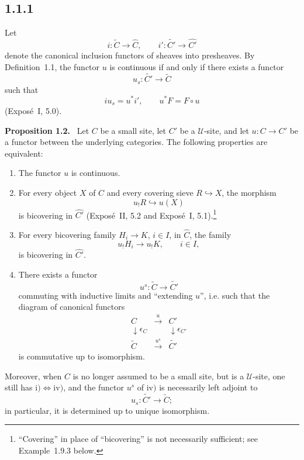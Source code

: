\documentclass[11pt]{article}
\newcommand{\U}{\mathcal{U}}
\newenvironment{statement}[1]{\par\medskip\noindent\textbf{#1.}\ }{\par\medskip}
\begin{document}
\subsection*{1.1.1}
Let
\[
i:\widetilde C\longrightarrow \widehat C,
\qquad
i':\widetilde{C'}\longrightarrow \widehat{C'}
\]
denote the canonical inclusion functors of sheaves into presheaves. By Definition~1.1, the functor \(u\) is continuous if and only if there exists a functor
\[
u_s:\widetilde{C'}\longrightarrow \widetilde C
\]
such that
\[
i u_s = u^* i',\qquad u^*F=F\circ u
\]
(Expos\'e~I, 5.0).

\begin{statement}{Proposition 1.2}
Let \(C\) be a small site, let \(C'\) be a \(\U\)-site, and let \(u:C\to C'\) be a functor between the underlying categories. The following properties are equivalent:
\begin{enumerate}[label=\roman*)]
\item The functor \(u\) is continuous.

\item For every object \(X\) of \(C\) and every covering sieve \(R\hookrightarrow X\), the morphism
\[
u_!R\hookrightarrow u(X)
\]
is bicovering in \(\widehat{C'}\) (Expos\'e~II, 5.2 and Expos\'e~I, 5.1).\footnote{``Covering'' in place of ``bicovering'' is not necessarily sufficient; see Example~1.9.3 below.}

\item For every bicovering family \(H_i\to K\), \(i\in I\), in \(\widehat C\), the family
\[
u_!H_i\longrightarrow u_!K,
\qquad i\in I,
\]
is bicovering in \(\widehat{C'}\).

\item There exists a functor
\[
u^s:\widetilde C\longrightarrow \widetilde{C'}
\]
commuting with inductive limits and ``extending \(u\)'', i.e. such that the diagram of canonical functors
\[
\begin{array}{ccc}
C & \xrightarrow{u} & C'\\
\downarrow\epsilon_C && \downarrow\epsilon_{C'}\\
\widetilde C & \xrightarrow{u^s} & \widetilde{C'}
\end{array}
\]
is commutative up to isomorphism.
\end{enumerate}
Moreover, when \(C\) is no longer assumed to be a small site, but is a \(\U\)-site, one still has \(\mathrm{i})\Leftrightarrow\mathrm{iv})\), and the functor \(u^s\) of \(\mathrm{iv})\) is necessarily left adjoint to
\[
u_s:\widetilde{C'}\longrightarrow\widetilde C;
\]
in particular, it is determined up to unique isomorphism.
\end{statement}
\end{document}
